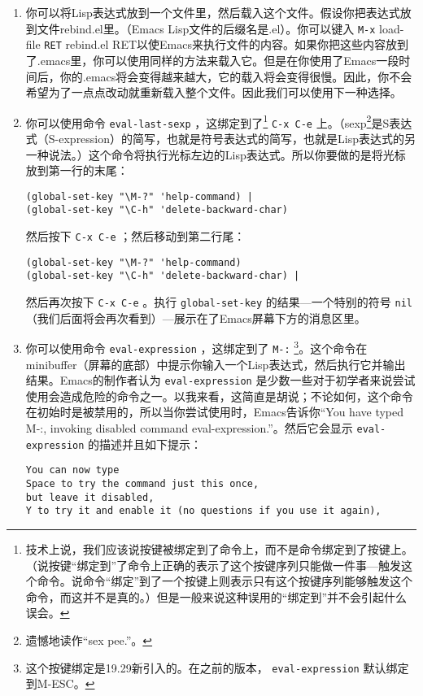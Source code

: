 \begin{enumerate}
  \item 你可以将Lisp表达式放到一个文件里，然后载入这个文件。假设你把表达式放到文件rebind.el里。（Emacs Lisp文件的后缀名是.el）。你可以键入 \verb|M-x| load-file \verb|RET| rebind.el RET以使Emacs来执行文件的内容。如果你把这些内容放到了.emacs里，你可以使用同样的方法来载入它。但是在你使用了Emacs一段时间后，你的.emacs将会变得越来越大，它的载入将会变得很慢。因此，你不会希望为了一点点改动就重新载入整个文件。因此我们可以使用下一种选择。
  \item 你可以使用命令 \texttt{eval-last-sexp} ，这绑定到了\footnote{技术上说，我们应该说按键被绑定到了命令上，而不是命令绑定到了按键上。（说按键“绑定到”了命令上正确的表示了这个按键序列只能做一件事---触发这个命令。说命令“绑定”到了一个按键上则表示只有这个按键序列能够触发这个命令，而这并不是真的。）但是一般来说这种误用的“绑定到”并不会引起什么误会。} \verb|C-x C-e| 上。（sexp\footnote{遗憾地读作“sex pee.”。}是S表达式（S-expression）的简写，也就是符号表达式的简写，也就是Lisp表达式的另一种说法。）这个命令将执行光标左边的Lisp表达式。所以你要做的是将光标放到第一行的末尾：
\begin{verbatim}
(global-set-key "\M-?" 'help-command) |
(global-set-key "\C-h" 'delete-backward-char)
\end{verbatim}
然后按下 \verb|C-x C-e| ；然后移动到第二行尾：
\begin{verbatim}
(global-set-key "\M-?" 'help-command)
(global-set-key "\C-h" 'delete-backward-char) |
\end{verbatim}
然后再次按下 \verb|C-x C-e| 。执行 \texttt{global-set-key} 的结果---一个特别的符号 \texttt{nil} （我们后面将会再次看到）---展示在了Emacs屏幕下方的消息区里。
  \item 你可以使用命令 \texttt{eval-expression} ，这绑定到了 \verb|M-:| \footnote{这个按键绑定是19.29新引入的。在之前的版本， \texttt{eval-expression} 默认绑定到M-ESC。}。这个命令在minibuffer（屏幕的底部）中提示你输入一个Lisp表达式，然后执行它并输出结果。Emacs的制作者认为 \texttt{eval-expression} 是少数一些对于初学者来说尝试使用会造成危险的命令之一。以我来看，这简直是胡说；不论如何，这个命令在初始时是被禁用的，所以当你尝试使用时，Emacs告诉你“You have typed M-:, invoking disabled command eval-expression.”。然后它会显示 \texttt{eval-expression} 的描述并且如下提示：
\begin{verbatim}
You can now type
Space to try the command just this once,
but leave it disabled,
Y to try it and enable it (no questions if you use it again),

\end{verbatim}
\end{enumerate}
